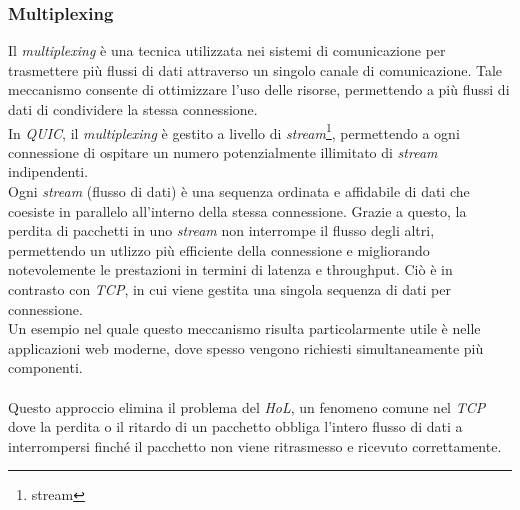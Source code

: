 \subsubsection{Multiplexing}
Il \emph{multiplexing} è una tecnica utilizzata nei sistemi di comunicazione per trasmettere più flussi di dati attraverso un singolo canale di comunicazione. 
Tale meccanismo consente di ottimizzare l'uso delle risorse, permettendo a più flussi di dati di condividere la stessa connessione.
\\
In \emph{QUIC}, il \emph{multiplexing} è gestito a livello di \emph{stream}\footnote{\gls{stream}}, permettendo a ogni connessione di ospitare un numero potenzialmente illimitato di \emph{stream} indipendenti.
\\
Ogni \emph{stream} (flusso di dati) è una sequenza ordinata e affidabile di dati che coesiste in parallelo all'interno della stessa connessione. Grazie a questo, la perdita di pacchetti in uno \emph{stream} non interrompe il flusso degli altri, permettendo un utlizzo più efficiente della connessione e migliorando notevolemente le prestazioni in termini di latenza e throughput. Ciò è in contrasto con \emph{TCP}, in cui viene gestita una singola sequenza di dati per connessione.
\\
Un esempio nel quale questo meccanismo risulta particolarmente utile è nelle applicazioni web moderne,
dove spesso vengono richiesti simultaneamente più componenti. 
\\\\
Questo approccio elimina il problema del \emph{\gls*{HoL}{}}, un fenomeno comune nel \emph{TCP} dove la perdita o il ritardo di un pacchetto obbliga l'intero flusso di dati a interrompersi  finché il pacchetto non viene ritrasmesso e ricevuto correttamente.

